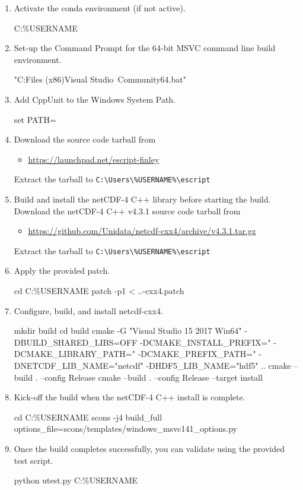 \documentclass{esysdoc}
\begin{document}
\begin{enumerate}
\item Activate the conda environment (if not active).
\begin{shellCode}
C:\Users\%USERNAME%
\end{shellCode}
\item Set-up the Command Prompt for the 64-bit MSVC command line build environment.
\begin{shellCode}
"C:\Program Files (x86)\Microsoft Visual Studio\
    Community\VC\Auxiliary\Build\vcvars64.bat"
\end{shellCode}
\item Add CppUnit to the Windows System Path.
\begin{shellCode}
set PATH=%
\end{shellCode}
\item Download the \escript source code tarball from
\begin{itemize}
\item[] \url{https://launchpad.net/escript-finley}
\end{itemize}
Extract the tarball to \verb!C:\Users\%USERNAME%\escript!
\item Build and install the netCDF-4 C++ library before starting the \escript
build.  Download the netCDF-4 C++ v4.3.1 source code tarball from
\begin{itemize}
\item[] \url{https://github.com/Unidata/netcdf-cxx4/archive/v4.3.1.tar.gz}
\end{itemize}
Extract the tarball to \verb!C:\Users\%USERNAME%\escript!
\item Apply the provided patch.
\begin{shellCode}
cd C:\Users\%USERNAME%
patch -p1 < ..\src\tools\anaconda{}\netcdf-cxx4.patch
\end{shellCode}
\item Configure, build, and install netcdf-cxx4.
\begin{shellCode}
mkdir build
cd build
cmake -G "Visual Studio 15 2017 Win64" -DBUILD_SHARED_LIBS=OFF
    -DCMAKE_INSTALL_PREFIX="%
    -DCMAKE_LIBRARY_PATH="%
    -DCMAKE_PREFIX_PATH="%
    -DNETCDF_LIB_NAME="netcdf" -DHDF5_LIB_NAME="hdf5" ..
cmake --build . --config Release
cmake --build . --config Release --target install
\end{shellCode}
\item Kick-off the \escript build when the netCDF-4 C++ install is complete.
\begin{shellCode}
cd C:\Users\%USERNAME%
scons -j4 build_full options_file=scons/templates/windows_msvc141_options.py
\end{shellCode}
\item Once the build completes successfully, you can validate \escript using
the provided test script.
\begin{shellCode}
python utest.py C:\Users\%USERNAME%
\end{shellCode}
\end{enumerate}
\end{document}
